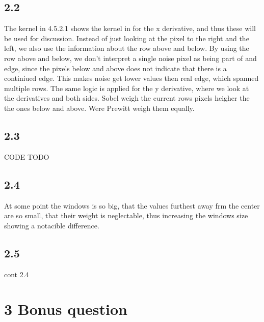 \documentclass[11pt]{report}
\begin{document}
\subsection{2.2}

The kernel in 4.5.2.1 shows the kernel in for the x derivative, and thus these will be used for discussion. Instead of just looking at the pixel to the right and the left, we also use the information about the row above and below. By using the row above and below, we don't interpret a single noise pixel as being part of and edge, since the pixels below and above does not indicate that there is a continiued edge. This makes noise get lower values then real edge, which spanned multiple rows. The same logic is applied for the y derivative, where we look at the derivatives and both sides. Sobel weigh the current rows pixels heigher the the ones below and above. Were Prewitt weigh them equally.



\subsection{2.3}
CODE TODO

\subsection{2.4}
At some point the windows is so big, that the values furthest away frm the center are so small, that their weight is neglectable, thus increasing the windows size showing a notacible difference.

\subsection{2.5}
cont 2.4

\section{3 Bonus question}
\end{document}
